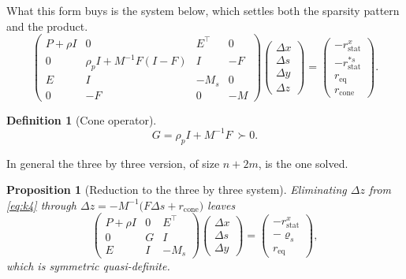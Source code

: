 \documentclass[a4paper,11pt]{book}
\theoremstyle{plain}
\newtheorem{proposition}[theorem]{Proposition}
\theoremstyle{definition}
\newtheorem{definition}[theorem]{Definition}
\theoremstyle{remark}
\numberwithin{equation}{chapter}
\numberwithin{algorithm}{chapter}
\begin{document}
	What this form buys is the system below, which settles both the sparsity
	pattern and the product.
	\begin{equation}\label{eq:k4}
		\begin{pmatrix}
			P+\rho I & 0 & E^\top & 0\\[1mm]
			0 & \rho_pI+M^{-1}F(I-F) & I & -F\\[1mm]
			E & I & -M_s & 0\\[1mm]
			0 & -F & 0 & -M
		\end{pmatrix}
		\begin{pmatrix}\Delta x\\ \Delta s\\ \Delta y\\ \Delta z\end{pmatrix}
		=\begin{pmatrix}
			-r^{x}_{\mathrm{stat}}\\ -r^{*s}_{\mathrm{stat}}\\
			r_{\mathrm{eq}}\\ r_{\mathrm{cone}}
		\end{pmatrix} .
	\end{equation}
	
	\begin{definition}[Cone operator]
		\begin{equation}
			G=\rho_pI+M^{-1}F\ \succ0 .
		\end{equation}
	\end{definition}
	
	In general the three by three version, of size $n+2m$, is the one solved.
	\begin{proposition}[Reduction to the three by three system]
		Eliminating $\Delta z$ from \eqref{eq:k4} through
		$\Delta z=-M^{-1}\bigl(F\Delta s+r_{\mathrm{cone}}\bigr)$ leaves
		\begin{equation}\label{eq:k3}
			\begin{pmatrix}
				P+\rho I & 0 & E^\top\\
				0 & G & I\\
				E & I & -M_s
			\end{pmatrix}
			\begin{pmatrix}\Delta x\\ \Delta s\\ \Delta y\end{pmatrix}
			=\begin{pmatrix}
				-r^{x}_{\mathrm{stat}}\\
				-\varrho_s\\
				r_{\mathrm{eq}}
			\end{pmatrix} ,
		\end{equation}
		which is symmetric quasi-definite.
	\end{proposition}
	
\end{document}
